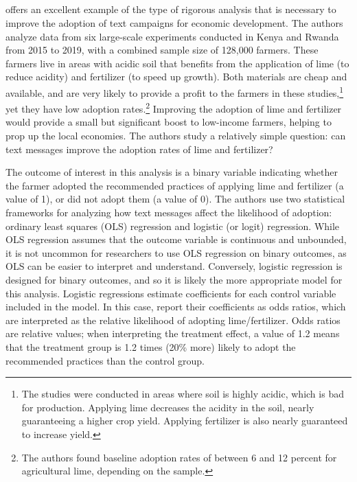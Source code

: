 \documentclass[12pt]{article}
\begin{document}
\subsection{\textcite{fabregas_digital_2025}}
\textcite{fabregas_digital_2025} offers an excellent example of the type of rigorous analysis that is necessary to improve the adoption of text campaigns for economic development. The authors analyze data from six large-scale experiments conducted in Kenya and Rwanda from 2015 to 2019, with a combined sample size of 128,000 farmers. These farmers live in areas with acidic soil that benefits from the application of lime (to reduce acidity) and fertilizer (to speed up growth). Both materials are cheap and available, and are very likely to provide a profit to the farmers in these studies,\footnote{The studies were conducted in areas where soil is highly acidic, which is bad for production. Applying lime decreases the acidity in the soil, nearly guaranteeing a higher crop yield. Applying fertilizer is also nearly guaranteed to increase yield.} yet they have low adoption rates.\footnote{The authors found baseline adoption rates of between 6 and 12 percent for agricultural lime, depending on the sample.} Improving the adoption of lime and fertilizer would provide a small but significant boost to low-income farmers, helping to prop up the local economies. The authors study a relatively simple question: can text messages improve the adoption rates of lime and fertilizer?

The outcome of interest in this analysis is a binary variable indicating whether the farmer adopted the recommended practices of applying lime and fertilizer (a value of 1), or did not adopt them (a value of 0). The authors use two statistical frameworks for analyzing how text messages affect the likelihood of adoption: ordinary least squares (OLS) regression and logistic (or logit) regression. While OLS regression assumes that the outcome variable is continuous and unbounded, it is not uncommon for researchers to use OLS regression on binary outcomes, as OLS can be easier to interpret and understand. Conversely, logistic regression is designed for binary outcomes, and so it is likely the more appropriate model for this analysis. Logistic regressions estimate coefficients for each control variable included in the model. In this case, \textcite{fabregas_digital_2025} report their coefficients as odds ratios, which are interpreted as the relative likelihood of adopting lime/fertilizer. Odds ratios are relative values; when interpreting the treatment effect, a value of 1.2 means that the treatment group is 1.2 times (20\% more) likely to adopt the recommended practices than the control group.
\end{document}
